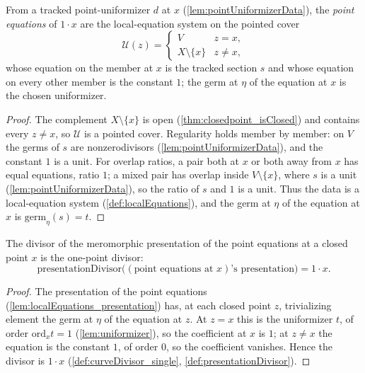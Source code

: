 \begin{definition}
  \label{def:pointEquations}
  \leanok
  From a tracked point-uniformizer \(d\) at \(x\) (\ref{lem:pointUniformizerData}), the
  \emph{point equations} of \(1 \cdot x\) are the local-equation system on the pointed cover
  \[
    \mathcal U(z) = \begin{cases} V & z = x, \\ X \setminus \{x\} & z \neq x, \end{cases}
  \]
  whose equation on the member at \(x\) is the tracked section \(s\) and whose equation on every
  other member is the constant \(1\); the germ at \(\eta\) of the equation at \(x\) is the chosen
  uniformizer.
\end{definition}
\begin{proof}
  \leanok
  The complement \(X \setminus \{x\}\) is open (\ref{thm:closedpoint_isClosed}) and contains every
  \(z \neq x\), so \(\mathcal U\) is a pointed cover. Regularity holds member by member: on \(V\)
  the germs of \(s\) are nonzerodivisors (\ref{lem:pointUniformizerData}), and the constant \(1\)
  is a unit. For overlap ratios, a pair both at \(x\) or both away from \(x\) has equal equations,
  ratio \(1\); a mixed pair has overlap inside \(V \setminus \{x\}\), where \(s\) is a unit
  (\ref{lem:pointUniformizerData}), so the ratio of \(s\) and \(1\) is a unit. Thus the data is a
  local-equation system (\ref{def:localEquations}), and the germ at \(\eta\) of the equation at
  \(x\) is \(\mathrm{germ}_\eta(s) = t\).
\end{proof}

\begin{theorem}
  \label{thm:presentationDivisor_pointEquations}
  \leanok
  The divisor of the meromorphic presentation of the point equations at a closed point \(x\) is
  the one-point divisor:
  \[
    \mathrm{presentationDivisor}\bigl((\text{point equations at } x)\text{'s presentation}\bigr) =
      1 \cdot x .
  \]
\end{theorem}
\begin{proof}
  \leanok
  The presentation of the point equations (\ref{lem:localEquations_presentation}) has, at each
  closed point \(z\), trivializing element the germ at \(\eta\) of the equation at \(z\). At \(z =
  x\) this is the uniformizer \(t\), of order \(\mathrm{ord}_x t = 1\) (\ref{lem:uniformizer}), so
  the coefficient at \(x\) is \(1\); at \(z \neq x\) the equation is the constant \(1\), of order
  \(0\), so the coefficient vanishes. Hence the divisor is \(1 \cdot x\)
  (\ref{def:curveDivisor_single}, \ref{def:presentationDivisor}).
\end{proof}

